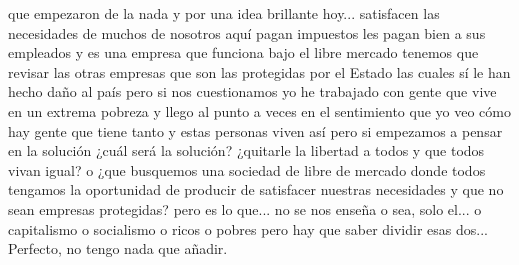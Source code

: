 que empezaron de la nada y por una idea brillante hoy... satisfacen las necesidades
de muchos de nosotros aquí pagan impuestos les pagan bien a sus empleados
y es una empresa que funciona bajo el libre mercado tenemos que revisar las otras empresas
que son las protegidas por el Estado las cuales sí le han hecho daño al país pero si nos cuestionamos
yo he trabajado con gente que vive en un extrema pobreza y llego al punto a veces en el sentimiento que yo veo
cómo hay gente que tiene tanto y estas personas viven así pero si empezamos a pensar en la solución
¿cuál será la solución? ¿quitarle la libertad a todos y que todos vivan igual?
o ¿que busquemos una sociedad de libre de mercado donde todos tengamos la oportunidad de producir
de satisfacer nuestras necesidades y que no sean empresas protegidas? pero es lo que... no se nos enseña
o sea, solo el... o capitalismo o socialismo o ricos o pobres pero hay que saber dividir esas dos...
Perfecto, no tengo nada que añadir.